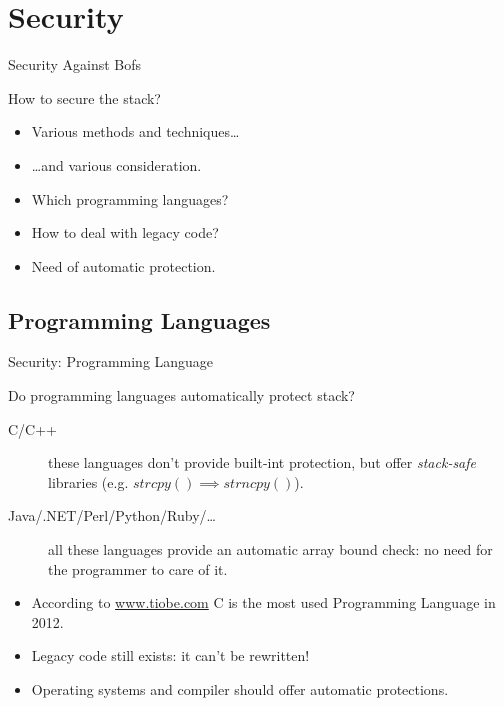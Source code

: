 \section{Security}
\begin{frame}{Security Against Bofs}
	\begin{block}{How to secure the stack?}
		\begin{itemize}
			\item Various methods and techniques\ldots
			\item \ldots{}and various consideration.
			\item Which programming languages?
			\item How to deal with legacy code?
			\item Need of automatic protection.
		\end{itemize}
	\end{block}
\end{frame}

\subsection{Programming Languages}
\begin{frame}{Security: Programming Language}
	\begin{block}{Do programming languages automatically protect stack?}
		\begin{description}
			\item[C/C++]these languages don't provide built-int protection, but offer
				\emph{stack-safe} libraries (e.g. $strcpy() \implies strncpy()$).
			\item[Java/.NET/Perl/Python/Ruby/\ldots]all these languages provide an
				automatic array bound check: no need for the programmer to care of it.
		\end{description}
		\begin{itemize}
			\item According to \url{www.tiobe.com} C is the most used Programming Language in 2012.
			\item \alert{Legacy code still exists: it can't be rewritten!}
			\item Operating systems and compiler should offer automatic protections.
		\end{itemize}
	\end{block}
\end{frame}


